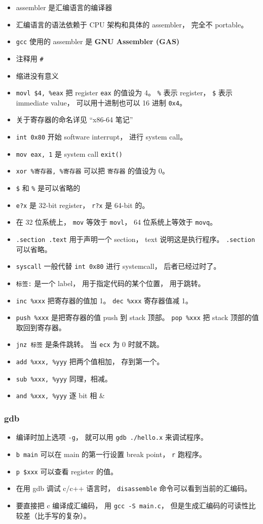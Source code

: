 \begin{itemize}
\item assembler 是汇编语言的编译器
\item 汇编语言的语法依赖于 CPU 架构和具体的 assembler， 完全不 portable。
\item \verb|gcc| 使用的 assembler 是 \textbf{GNU Assembler (GAS)}
\item 注释用 \verb|#|
\item 缩进没有意义
\item \verb|movl $4, %eax| 把 register \verb|eax| 的值设为 4。 \verb|%| 表示 register， \verb|$| 表示 immediate value， 可以用十进制也可以 16 进制 \verb|0x4|。
\item 关于寄存器的命名详见 “x86-64 笔记”
\item \verb|int 0x80| 开始 software interrupt， 进行 system call。
\item \verb|mov eax, 1| 是 system call \verb|exit()|
\item \verb|xor %寄存器, %寄存器| 可以把 \verb|寄存器| 的值设为 0。
\item \verb|$| 和 \verb|%| 是可以省略的
\item \verb|e?x| 是 32-bit register， \verb|r?x| 是 64-bit 的。
\item 在 32 位系统上， \verb|mov| 等效于 \verb|movl|， 64 位系统上等效于 \verb|movq|。
\item \verb|.section .text| 用于声明一个 section， text 说明这是执行程序。 \verb|.section| 可以省略。
\item \verb|syscall| 一般代替 \verb|int 0x80| 进行 systemcall， 后者已经过时了。
\item \verb|标签:| 是一个 label， 用于指定代码的某个位置， 用于跳转。
\item \verb|inc %xxx| 把寄存器的值加 1。 \verb|dec %xxx| 寄存器值减 1。
\item \verb|push %xxx| 是把寄存器的值 push 到 stack 顶部。 \verb|pop %xxx| 把 stack 顶部的值取回到寄存器。
\item \verb|jnz 标签| 是条件跳转。 当 \verb|ecx| 为 0 时就不跳。
\item \verb|add %xxx, %yyy| 把两个值相加， 存到第一个。
\item \verb|sub %xxx, %yyy| 同理，相减。
\item \verb|and %xxx, %yyy| 逐 bit 相 \&
\end{itemize}

\subsubsection{gdb}
\begin{itemize}
\item 编译时加上选项 \verb|-g|， 就可以用 \verb|gdb ./hello.x| 来调试程序。
\item \verb|b main| 可以在 main 的第一行设置 break point， \verb|r| 跑程序。
\item \verb|p $xxx| 可以查看 register 的值。
\item 在用 gdb 调试 c/c++ 语言时， \verb|disassemble| 命令可以看到当前的汇编码。
\item 要直接把 c 编译成汇编码， 用 \verb|gcc -S main.c|， 但是生成汇编码的可读性比较差（比手写的复杂）。
\end{itemize}

